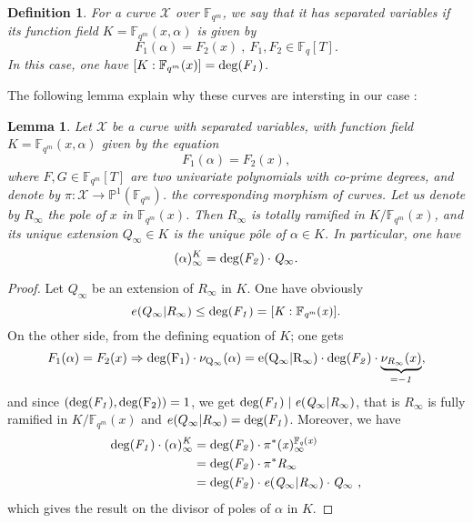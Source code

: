 \documentclass[10pt]{article}
\newtheorem{def1}{Definition}[]
\newtheorem{lem1}{Lemma}[]
\newcommand{\s}{\vspace{0.3cm}}
\newcommand{\cd}{\cdot}
\newcommand{\fqm}{\mathbb{F}_{q^m}}
\newcommand{\fq}{\mathbb{F}_q}
\newcommand{\X}{\mathcal{X}}
\begin{document}
\s

\begin{def1}
For a curve $\X$ over $\fqm$, we say that it has separated variables if its function field $K=\fqm(x,\alpha)$ is given by
\[F_1(\alpha) = F_2(x) \ , \ F_1,F_2 \in \fq[T].\]
In this case, one have $[K:\fqm(x)] = \rm{deg}(\it{F_1})$.
\end{def1}

\s

The following lemma explain why these curves are intersting in our case :

\s

\begin{lem1}
Let $\X$ be a curve with separated variables, with function field $K=\fqm(x,\alpha)$ given by the equation
\[F_1(\alpha) = F_2(x),\]
where $F,G \in \fqm[T]$ are two univariate polynomials with co-prime degrees, and denote by $\pi : \X \rightarrow \mathbb{P}^1(\fqm)$. the corresponding morphism of curves. Let us denote by $R_{\infty}$ the pole of $x$ in $\fqm(x)$. Then $R_{\infty}$ is totally ramified in $K/\fqm(x)$, and its unique extension $Q_{\infty} \in K$ is the unique pôle of $\alpha \in K$. In particular, one have 
\[(\alpha)^K_{\infty} = \rm{deg}\it{(F_2) \cd Q_{\infty}}.\]
\end{lem1}

\s

\begin{proof}
Let $Q_{\infty}$ be an extension of $R_{\infty}$ in $K$. One have obviously
\[e(Q_{\infty}|R_{\infty}) \leq \rm{deg}\it(F_1)=[K:\fqm(x)].\]
On the other side, from the defining equation of $K$; one gets
\[F_1(\alpha) = F_2(x) \Rightarrow \rm{deg}(F_1) \cd \nu_{Q_{\infty}}(\alpha) = e(Q_{\infty}|R_{\infty}) \cd \rm{deg}\it(F_2) \cd \underbrace{\nu_{R_{\infty}}(x)}_{=-1},\]
and since $(\rm{deg}\it(F_1),\rm{deg}(F_2))=1$, we get $\rm{deg}\it(F_1) \mid e(Q_{\infty}|R_{\infty})$, that is $R_{\infty}$ is fully ramified in $K/\fqm(x)$ and $e(Q_{\infty}|R_{\infty})=\rm{deg}\it(F_1)$. Moreover, we have 
\begin{align*}
\rm{deg}\it(F_1) \cd (\alpha)^K_{\infty} &= \rm{deg}\it(F_2) \cd \pi^*(x)^{\fq(x)}_{\infty} \\
&= \rm{deg}\it(F_2) \cd \pi^* R_{\infty} \\
&= \rm{deg}\it(F_2) \cd e(Q_{\infty}|R_{\infty}) \cd Q_{\infty} \ ,
\end{align*}
which gives the result on the divisor of poles of $\alpha$ in $K$.
\end{proof}
\end{document}
